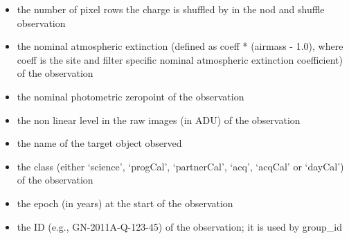 \documentclass[letterpaper,10pt,english]{sphinxmanual}
\begin{document}
\begin{itemize}
\item {} 
the number of pixel rows the charge is shuffled by in the nod and shuffle
observation

\end{itemize}

\begin{itemize}
\item {} 
the nominal atmospheric extinction (defined as coeff * (airmass - 1.0), where
coeff is the site and filter specific nominal atmospheric extinction
coefficient) of the observation

\end{itemize}

\begin{itemize}
\item {} 
the nominal photometric zeropoint of the observation

\end{itemize}

\begin{itemize}
\item {} 
the non linear level in the raw images (in ADU) of the observation

\end{itemize}

\begin{itemize}
\item {} 
the name of the target object observed

\end{itemize}

\begin{itemize}
\item {} 
the class (either `science', `progCal', `partnerCal', `acq', `acqCal' or
`dayCal') of the observation

\end{itemize}

\begin{itemize}
\item {} 
the epoch (in years) at the start of the observation

\end{itemize}

\begin{itemize}
\item {} 
the ID (e.g., GN-2011A-Q-123-45) of the observation; it is used by group\_id

\end{itemize}
\end{document}
